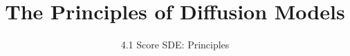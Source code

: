 
\title{The Principles of Diffusion Models}
\subtitle{4.1 Score SDE: Principles}


\begin{frame}
    \titlepage
\end{frame}


